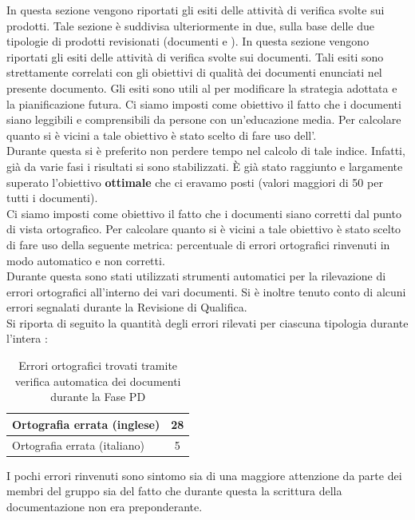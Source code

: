		In questa sezione vengono riportati gli esiti delle attività di verifica svolte sui prodotti. Tale sezione è suddivisa ulteriormente in due, sulla base delle due tipologie di prodotti revisionati (documenti e ).
			In questa sezione vengono riportati gli esiti delle attività di verifica svolte sui documenti. Tali esiti sono strettamente correlati con gli obiettivi di qualità dei documenti enunciati nel presente documento. Gli esiti sono utili al  per modificare la strategia adottata e la pianificazione futura.
				Ci siamo imposti come obiettivo il fatto che i documenti siano leggibili e comprensibili da persone con un'educazione media. Per calcolare quanto si è vicini a tale obiettivo è stato scelto di fare uso dell'.\\
				Durante questa  si è preferito non perdere tempo nel calcolo di tale indice. Infatti, già da varie fasi i risultati si sono stabilizzati. È già stato raggiunto e largamente superato l'obiettivo \textbf{ottimale} che ci eravamo posti (valori maggiori di 50 per tutti i documenti).\\
				Ci siamo imposti come obiettivo il fatto che i documenti siano corretti dal punto di vista ortografico. Per calcolare quanto si è vicini a tale obiettivo è stato scelto di fare uso della seguente metrica: percentuale di errori ortografici rinvenuti in modo automatico e non corretti.\\
				Durante questa  sono stati utilizzati strumenti automatici per la rilevazione di errori ortografici all'interno dei vari documenti. Si è inoltre tenuto conto di alcuni errori segnalati durante la Revisione di Qualifica.\\
				Si riporta di seguito la quantità degli errori rilevati per ciascuna tipologia durante l'intera :
				\begin{table}[H]
					\centering
						\begin{tabu}{| l | c |} \hline
							Ortografia errata (inglese) & 28\\ \hline
							Ortografia errata (italiano) & 5 \\ \hline
						\end{tabu}
					\caption{Errori ortografici trovati tramite verifica automatica dei documenti durante la Fase PD}
				\end{table}
				I pochi errori rinvenuti sono sintomo sia di una maggiore attenzione da parte dei membri del gruppo sia del fatto che durante questa  la scrittura della documentazione non era preponderante.\\
